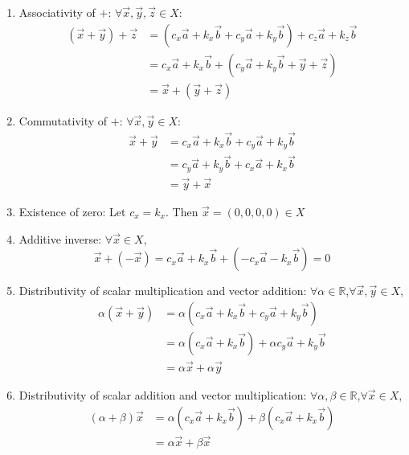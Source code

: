 \documentclass{article}
\newcommand{\R}{\mathbb{R}}
\begin{document}
\begin{enumerate}
	\item Associativity of $+$: $\forall \vec{x},\vec{y},\vec{z}\in X$:
		\begin{align*}
			(\vec{x} + \vec{y})+\vec{z} 	&= (c_x\vec{a} + k_x\vec{b} + c_y\vec{a} + k_y\vec{b})+c_z\vec{a}+k_z\vec{b} 	\\
			&= c_x\vec{a} + k_x\vec{b} +  (c_y\vec{a} + k_y\vec{b} + \vec{y}+ \vec{z}) \\
			&= \vec{x} + (\vec{y}+ \vec{z})	
		\end{align*}
		
	\item Commutativity of $+$: $\forall \vec{x},\vec{y}\in X$:
		\begin{align*}
			\vec{x} +\vec{y} 	&= 	c_x\vec{a} + k_x\vec{b} + c_y\vec{a} + k_y\vec{b}	\\
								&= c_y\vec{a} + k_y\vec{b} + c_x\vec{a} + k_x\vec{b}  	\\
								&= \vec{y}+\vec{x}
		\end{align*}
		
	\item Existence of zero: Let $c_x=k_x$. Then $\vec{x}=(0,0,0,0)\in X$
	
	\item Additive inverse: $\forall \vec{x}\in X$,
		\[
			\vec{x} + (-\vec{x}) = c_x\vec{a} + k_x\vec{b} + (-c_x\vec{a} - k_x\vec{b}) = 0
		\]
	
	\item Distributivity of scalar multiplication and vector addition: $\forall\alpha\in\R$,$\forall \vec{x},\vec{y}\in X$,
		\begin{align*}
			\alpha(\vec{x}+\vec{y})														
			&= \alpha(c_x\vec{a} + k_x\vec{b} + c_y\vec{a} + k_y\vec{b}) 		\\
			&= \alpha(c_x\vec{a} + k_x\vec{b}) + \alpha c_y\vec{a} + k_y\vec{b}	\\
			&= \alpha\vec{x} + \alpha \vec{y}										
		\end{align*}
		
	\item Distributivity of scalar addition and vector multiplication: $\forall\alpha,\beta\in\R$,$\forall \vec{x}\in X$,
		\begin{align*}
			(\alpha + \beta)\vec{x}												
			&= \alpha(c_x\vec{a} + k_x\vec{b}) + \beta(c_x\vec{a} + k_x\vec{b})	\\
			&= \alpha \vec{x} + \beta \vec{x}
		\end{align*}


\end{enumerate}
\end{document}
